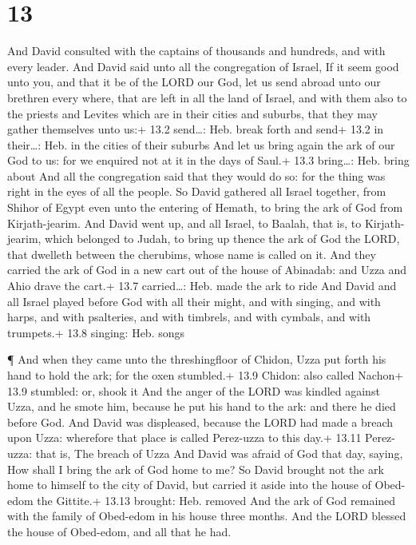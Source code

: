 \hypertarget{section-12}{%
\section{13}\label{section-12}}

 And David consulted with the captains of thousands and
hundreds, and with every leader.  And David said unto all
the congregation of Israel, If it seem good unto you, and that it be of
the LORD our God, let us send abroad unto our brethren every where, that
are left in all the land of Israel, and with them also to the priests
and Levites which are in their cities and suburbs, that they may gather
themselves unto us:+ 13.2 send\ldots: Heb. break forth and send+ 13.2 in
their\ldots: Heb. in the cities of their suburbs  And let us
bring again the ark of our God to us: for we enquired not at it in the
days of Saul.+ 13.3 bring\ldots: Heb. bring about  And all
the congregation said that they would do so: for the thing was right in
the eyes of all the people.  So David gathered all Israel
together, from Shihor of Egypt even unto the entering of Hemath, to
bring the ark of God from Kirjath-jearim.  And David went
up, and all Israel, to Baalah, that is, to Kirjath-jearim, which
belonged to Judah, to bring up thence the ark of God the LORD, that
dwelleth between the cherubims, whose name is called on it. 
And they carried the ark of God in a new cart out of the house of
Abinadab: and Uzza and Ahio drave the cart.+ 13.7 carried\ldots: Heb.
made the ark to ride  And David and all Israel played before
God with all their might, and with singing, and with harps, and with
psalteries, and with timbrels, and with cymbals, and with trumpets.+
13.8 singing: Heb. songs

 ¶ And when they came unto the threshingfloor of Chidon,
Uzza put forth his hand to hold the ark; for the oxen stumbled.+ 13.9
Chidon: also called Nachon+ 13.9 stumbled: or, shook it 
And the anger of the LORD was kindled against Uzza, and he smote him,
because he put his hand to the ark: and there he died before God.
 And David was displeased, because the LORD had made a
breach upon Uzza: wherefore that place is called Perez-uzza to this
day.+ 13.11 Perez-uzza: that is, The breach of Uzza  And
David was afraid of God that day, saying, How shall I bring the ark of
God home to me?  So David brought not the ark home to
himself to the city of David, but carried it aside into the house of
Obed-edom the Gittite.+ 13.13 brought: Heb. removed  And
the ark of God remained with the family of Obed-edom in his house three
months. And the LORD blessed the house of Obed-edom, and all that he
had.

